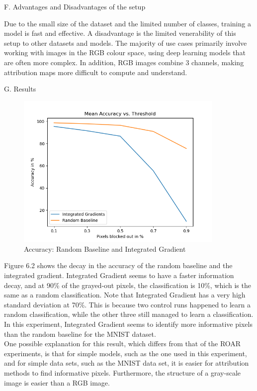 F. Advantages and Disadvantages of the setup

Due to the small size of the dataset and the limited number of classes, training a model is fast and effective. A disadvantage is the limited venerability of this setup to other datasets and models. The majority of use cases primarily involve working with images in the RGB colour space, using deep learning models that are often more complex. In addition, RGB images combine 3 channels, making attribution maps more difficult to compute and understand.

G. Results

\begin{figure}[H]
	\centering
	\includegraphics[width=100mm]{figs/mean_accuracy_vs_threshold}
	\caption{Accuracy: Random Baseline and Integrated Gradient}
	\label{fig:Accuracy}
	
\end{figure}

Figure 6.2 shows the decay in the accuracy of the random baseline and the integrated gradient. Integrated Gradient seems to have a faster information decay, and at 90\% of the grayed-out pixels, the classification is 10\%, which is the same as a random classification. Note that Integrated Gradient has a very high standard deviation at 70\%. This is because two control runs happened to learn a random classification, while the other three still managed to learn a classification. In this experiment, Integrated Gradient seems to identify more informative pixels than the random baseline for the MNIST dataset. \\
One possible explanation for this result, which differs from that of the ROAR experiments, is that for simple models, such as the one used in this experiment, and for simple data sets, such as the MNIST data set, it is easier for attribution methods to find informative pixels. Furthermore, the structure of a gray-scale image is easier than a RGB image.

